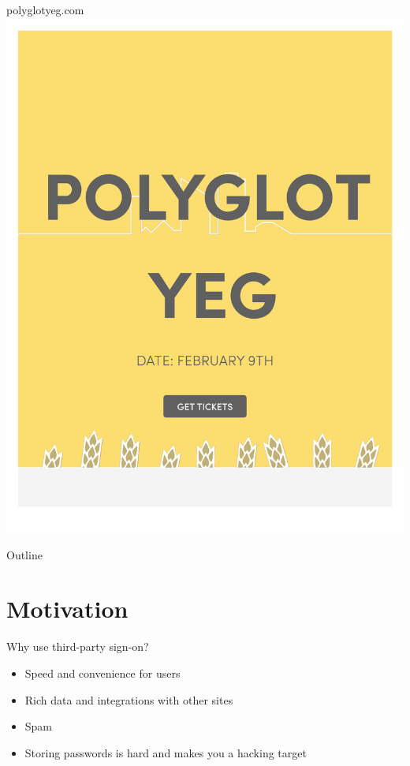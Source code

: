 \documentclass[xcolor=svgnames,17pt]{beamer}
\newcommand*{\sizefont}[1]{%
    \ifcase#1\relax
    \or \tiny
    \or \scriptsize
    \or \footnotesize
    \or \small
    \or \normalsize
    \or \large
    \or \Large
    \or \LARGE
    \or \huge
    \or \Huge
    \fi}
\begin{document}
\begin{frame}{polyglotyeg.com}
\includegraphics[width=0.7\paperwidth,center]{polyglot.pdf}
\end{frame}


\begin{frame}[plain]
\titlepage
\end{frame}

\begin{frame}{Outline}
\tableofcontents
\end{frame}

\section{Motivation}

\begin{frame}{Why use third-party sign-on?}
\begin{itemize}
\item Speed and convenience for users
\pause
\item Rich data and integrations with other sites
\pause
\item Spam
\pause
\item Storing passwords is hard and makes you a hacking target
\end{itemize}
\end{frame}
\end{document}
